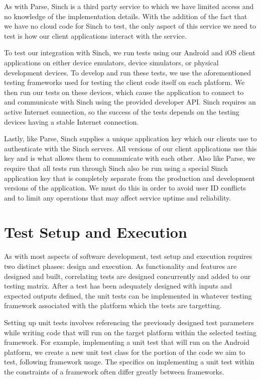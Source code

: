 As with Parse, Sinch is a third party service to which we have limited access
and no knowledge of the implementation details. With the addition of the fact
that we have no cloud code for Sinch to test, the only aspect of this service we
need to test is how our client applications interact with the service.

To test our integration with Sinch, we run tests using our Android and iOS
client applications on either device emulators, device simulators, or physical
development devices. To develop and run these tests, we use the aforementioned
testing frameworks used for testing the client code itself on each platform.
We then run our tests on these devices, which cause the application to connect
to and communicate with Sinch using the provided developer API. Sinch requires
an active Internet connection, so the success of the tests depends on the
testing devices having a stable Internet connection.

Lastly, like Parse, Sinch supplies a unique application key which our clients
use to authenticate with the Sinch servers. All versions of our client
applications use this key and is what allows them to communicate with each
other. Also like Parse, we require that all tests run through Sinch also be run
using a special Sinch application key that is completely separate from the
production and development versions of the application. We must do this in order
to avoid user ID conflicts and to limit any operations that may affect service
uptime and reliability.


\section{Test Setup and Execution}

As with most aspects of software development, test setup and execution requires
two distinct phases: design and execution. As functionality and features are
designed and built, correlating tests are designed concurrently and added to our
testing matrix. After a test has been adequately designed with inputs and
expected outputs defined, the unit tests can be implemented in whatever testing
framework associated with the platform which the tests are targetting.

Setting up unit tests involves referencing the previously designed test
parameters while writing code that will run on the target platform within the
selected testing framework. For example, implementing a unit test that will run
on the Android platform, we create a new unit test class for the portion of the
code we aim to test, following framework usage. The specifics on implementing a
unit test within the constraints of a framework often differ greatly between
frameworks.

